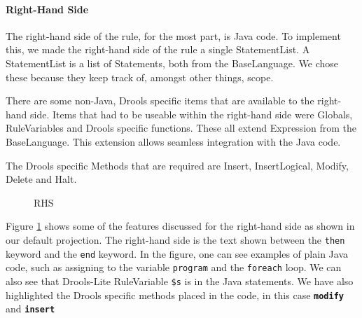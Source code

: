 \paragraph{Right-Hand Side} The right-hand side of the rule, for the most part, is Java code.
To implement this, we made the right-hand side of the rule a single StatementList.
A StatementList is a list of Statements, both from the BaseLanguage.
We chose these because they keep track of, amongst other things, scope.

There are some non-Java, Drools specific items that are available to the right-hand side.
Items that had to be useable within the right-hand side were Globals, RuleVariables and Drools specific functions.
These all extend Expression from the BaseLanguage.
This extension allows seamless integration with the Java code.

The Drools specific Methods that are required are Insert, InsertLogical, Modify, Delete and Halt.

\begin{figure}[!h]
    \centering
    \caption{RHS}
    \label{fig:RHS}
\end{figure}

Figure \ref{fig:RHS} shows some of the features discussed for the right-hand side as shown in our default projection.
The right-hand side is the text shown between the \texttt{then} keyword and the \texttt{end} keyword.
In the figure, one can see examples of plain Java code, such as assigning to the variable \texttt{program} and the \texttt{foreach} loop.
We can also see that Drools-Lite RuleVariable \texttt{\$s} is in the Java statements.
We have also highlighted the Drools specific methods placed in the code, in this case \texttt{\textbf{modify}} and \texttt{\textbf{insert}}   

